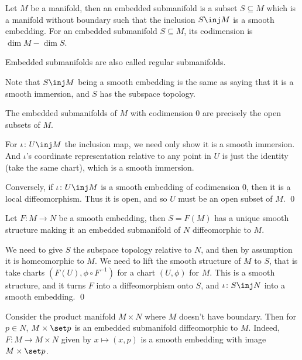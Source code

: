\bdefn

    Let $M$ be a manifold, then an {\emphcolor embedded submanifold} is a subset $S\subseteq M$ which is a manifold without boundary
    such that the inclusion $S\inj M$ is a smooth embedding.
    For an embedded submanifold $S\subseteq M$, its {\emphcolor codimension} is $\dim M-\dim S$.

\edefn

\bnote

    Embedded submanifolds are also called {\emphcolor regular submanifolds}.

\enote

Note that $S\inj M$ being a smooth embedding is the same as saying that it is a smooth immersion, and $S$ has the subspace topology.

\bprop

    The embedded submanifolds of $M$ with codimension $0$ are precisely the open subsets of $M$.

\eprop

\bproof

    For $\iota\colon U\inj M$ the inclusion map, we need only show it is a smooth immersion.
    And $\iota$'s coordinate representation relative to any point in $U$ is just the identity (take the same chart), which is
    a smooth immersion.

    Conversely, if $\iota\colon U\inj M$ is a smooth embedding of codimension $0$, then it is a local diffeomorphism.
    Thus it is open, and so $U$ must be an open subset of $M$.
    \qed

\eproof

\bprop

    Let $F\colon M\to N$ be a smooth embedding, then $S=F(M)$ has a unique smooth structure making it an embedded submanifold of $N$
    diffeomorphic to $M$.

\eprop

\bproof

    We need to give $S$ the subspace topology relative to $N$, and then by assumption it is homeomorphic to $M$.
    We need to lift the smooth structure of $M$ to $S$, that is take charts $(F(U),\phi\circ F^{-1})$ for a chart $(U,\phi)$ for $M$.
    This is a smooth structure, and it turns $F$ into a diffeomorphism onto $S$, and $\iota\colon S\inj N$ into a smooth embedding.
    \qed

\eproof

\bexam

    Consider the product manifold $M\times N$ where $M$ doesn't have boundary.
    Then for $p\in N$, $M\times\set p$ is an embedded submanifold diffeomorphic to $M$.
    Indeed, $F\colon M\to M\times N$ given by $x\mapsto(x,p)$ is a smooth embedding with image $M\times\set p$.

